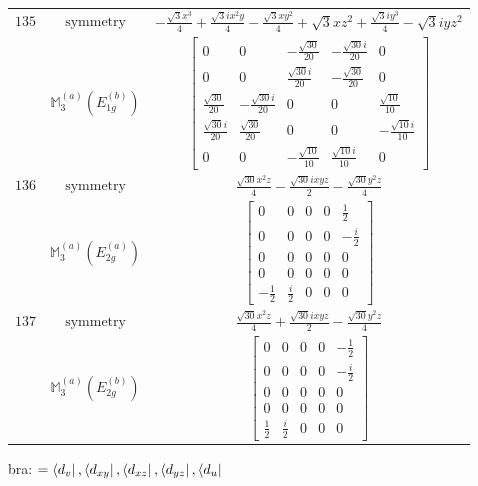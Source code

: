 \documentclass[fleqn,8pt,landscape]{jsarticle}
\begin{document}
\begin{longtable}{ccc}
$ 135 $ & $ \text{symmetry} $ & $ - \frac{\sqrt{3} x^{3}}{4} + \frac{\sqrt{3} i x^{2} y}{4} - \frac{\sqrt{3} x y^{2}}{4} + \sqrt{3} x z^{2} + \frac{\sqrt{3} i y^{3}}{4} - \sqrt{3} i y z^{2} $ \\
$  $ & $ \mathbb{M}_{3}^{(a)}(E_{1g}^{(b)}) $ & $ \begin{bmatrix} 0 & 0 & - \frac{\sqrt{30}}{20} & - \frac{\sqrt{30} i}{20} & 0 \\ 0 & 0 & \frac{\sqrt{30} i}{20} & - \frac{\sqrt{30}}{20} & 0 \\ \frac{\sqrt{30}}{20} & - \frac{\sqrt{30} i}{20} & 0 & 0 & \frac{\sqrt{10}}{10} \\ \frac{\sqrt{30} i}{20} & \frac{\sqrt{30}}{20} & 0 & 0 & - \frac{\sqrt{10} i}{10} \\ 0 & 0 & - \frac{\sqrt{10}}{10} & \frac{\sqrt{10} i}{10} & 0 \end{bmatrix} $ \\ \hline
$ 136 $ & $ \text{symmetry} $ & $ \frac{\sqrt{30} x^{2} z}{4} - \frac{\sqrt{30} i x y z}{2} - \frac{\sqrt{30} y^{2} z}{4} $ \\
$  $ & $ \mathbb{M}_{3}^{(a)}(E_{2g}^{(a)}) $ & $ \begin{bmatrix} 0 & 0 & 0 & 0 & \frac{1}{2} \\ 0 & 0 & 0 & 0 & - \frac{i}{2} \\ 0 & 0 & 0 & 0 & 0 \\ 0 & 0 & 0 & 0 & 0 \\ - \frac{1}{2} & \frac{i}{2} & 0 & 0 & 0 \end{bmatrix} $ \\ \hline
$ 137 $ & $ \text{symmetry} $ & $ \frac{\sqrt{30} x^{2} z}{4} + \frac{\sqrt{30} i x y z}{2} - \frac{\sqrt{30} y^{2} z}{4} $ \\
$  $ & $ \mathbb{M}_{3}^{(a)}(E_{2g}^{(b)}) $ & $ \begin{bmatrix} 0 & 0 & 0 & 0 & - \frac{1}{2} \\ 0 & 0 & 0 & 0 & - \frac{i}{2} \\ 0 & 0 & 0 & 0 & 0 \\ 0 & 0 & 0 & 0 & 0 \\ \frac{1}{2} & \frac{i}{2} & 0 & 0 & 0 \end{bmatrix} $ \\ \hline
\end{longtable}
bra: $=\bra{d_{v}}, \bra{d_{xy}}, \bra{d_{xz}}, \bra{d_{yz}}, \bra{d_{u}}$
\end{document}

